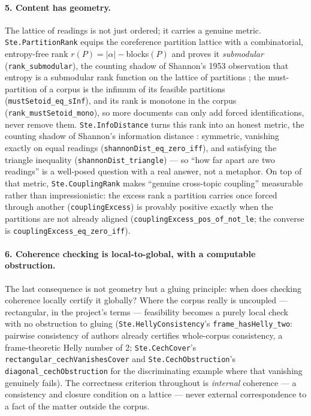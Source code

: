 \documentclass[11pt]{article}
\newcommand{\code}[1]{\texttt{#1}}
\begin{document}
\paragraph{5. Content has geometry.}
The lattice of readings is not just ordered; it carries a genuine
metric. \code{Ste.PartitionRank} equips the coreference partition
lattice with a combinatorial, entropy-free rank
$r(P) = |\alpha| - {}$blocks$(P)$ and proves it \emph{submodular}
(\code{rank\_submodular}), the counting shadow of Shannon's 1953
observation that entropy is a submodular rank function on the lattice
of partitions \citep{shannon1953lattice,delsol2024}; the
must-partition of a corpus is the infimum of its feasible partitions
(\code{mustSetoid\_eq\_sInf}), and its rank is monotone in the corpus
(\code{rank\_mustSetoid\_mono}), so more
documents can only add forced identifications, never remove them.
\code{Ste.InfoDistance} turns this rank into an honest metric, the
counting shadow of Shannon's information distance
\citep{shannon1953lattice,delsol2024}: symmetric,
vanishing exactly on equal readings (\code{shannonDist\_eq\_zero\_iff}),
and satisfying the triangle inequality
(\code{shannonDist\_triangle}) --- so ``how far apart are two
readings'' is a well-posed question with a real answer, not a metaphor.
On top of that metric, \code{Ste.CouplingRank} makes ``genuine
cross-topic coupling'' measurable rather than impressionistic: the
excess rank a partition carries once forced through another
(\code{couplingExcess}) is provably positive exactly when the
partitions are not already aligned
(\code{couplingExcess\_pos\_of\_not\_le}; the converse is
\code{couplingExcess\_eq\_zero\_iff}).

\paragraph{6. Coherence checking is local-to-global, with a computable
obstruction.}
The last consequence is not geometry but a gluing principle: when does
checking coherence locally certify it globally? Where the corpus really
is uncoupled --- rectangular, in the project's terms --- feasibility
becomes a purely local check with no obstruction to gluing
(\code{Ste.HellyConsistency}'s \code{frame\_hasHelly\_two}: pairwise
consistency of authors already certifies whole-corpus consistency, a
frame-theoretic Helly number of 2; \code{Ste.CechCover}'s
\code{rectangular\_cechVanishesCover} and \code{Ste.CechObstruction}'s
\code{diagonal\_cechObstruction} for the discriminating example where
that vanishing genuinely fails). The correctness criterion throughout
is \emph{internal} coherence --- a consistency and closure condition
on a lattice --- never external correspondence to a fact of the matter
outside the corpus.
\end{document}
